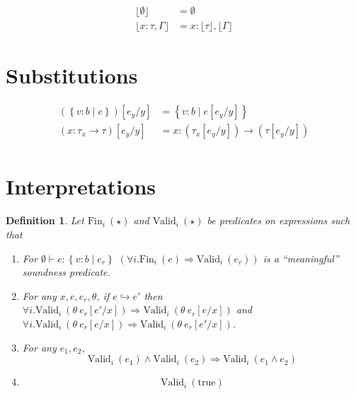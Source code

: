 \documentclass[10pt,a4paper]{article}
\newtheorem{definition}{Definition}
\newcommand\etrue{\ensuremath{\text{true}}}
\newcommand\tref[3]{\ensuremath{\left\lbrace {#1} \colon {#2} \mid {#3} \right\rbrace}}
\newcommand\tconref[4]{\tref{#3}{\tcon{#1}{#2}}{#4}}
\newcommand\tcon[2]{\ensuremath{#1\ #2}}
\newcommand\tfun[3]{\ensuremath{#1\colon #2 \rightarrow #3}}
\newcommand\tfunref[5]{\tfun{#1}{#2}{#3}}
\newcommand\validi[1]{\ensuremath{\text{Valid}_{i}\ (#1)}}
\newcommand\fini[1]{\ensuremath{\text{Fin}_{i}\ (#1)}}
\newcommand\generalconditionInterp[2]
	{\ensuremath{(\forall i. \fini{#1} \Rightarrow \validi{#2})}}
\newcommand\generalconditionImpl[2]
	{\ensuremath{\forall i . \validi{#1} \Rightarrow \validi{#2}}}
\newcommand\sub[2]{\ensuremath{\left[ #2 / #1 \right]}}
\newcommand\erase[1]{\ensuremath{\lfloor #1 \rfloor}}
\newcommand\eval[2]{\ensuremath{#1 \hookrightarrow #2}}
\newcommand\hastype[3]{\ensuremath{#1 \vdash #2 : #3}}
\begin{document}
\begin{align*}
\erase{\emptyset}&=\emptyset\\
\erase{x\colon\tau, \Gamma}&= x\colon\erase{\tau},\erase{\Gamma}
\end{align*}

\section*{Substitutions}
\begin{align*}
(\tref{v}{b}{e})\sub{y}{e_y} &=\tref{v}{b}{e\sub{y}{e_y}}\\
(\tfunref{x}{\tau_x}{\tau}{v}{e})\sub{y}{e_y} &=
	\tfunref{x}{(\tau_x\sub{y}{e_y})}{(\tau\sub{y}{e_y})}{v}{e\sub{y}{e_y}}\\
\end{align*}

\section*{Interpretations}
\begin{definition} \label{def:valid}
Let \fini{\star} and \validi{\star} be predicates on expressions such that
\begin{enumerate}
\item 
	For \hastype{\emptyset}{e}{\tref{v}{b}{e_r}}
	\generalconditionInterp{e}{e_r} is a ``meaningful''
	soundness predicate.

\item For any $x, e, e_r, \theta$, if \eval{e}{e'} then 
	\generalconditionImpl{\theta\ e_r\sub{x}{e'}}{\theta\ e_r\sub{x}{e}} and
	\generalconditionImpl{\theta\ e_r\sub{x}{e}}{\theta\ e_r\sub{x}{e'}}.

\item For any $e_1, e_2$, 
$$\validi{e_1} \land \validi{e_2} \Rightarrow \validi{e_1 \land e_2}$$

\item $$\validi{\etrue}$$
\end{enumerate} 
\end{definition}
\end{document}
